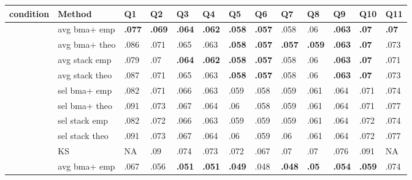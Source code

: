 \documentclass[border={-20pt 28pt 20pt -20pt}]{standalone}
\begin{document}
                   \pagecolor{Mycolor2}
                   \renewcommand{\arraystretch}{1.1} 
\centering\begingroup\fontsize{9}{11}\selectfont

\begin{tabular}{>{\centering\arraybackslash}p{4.4em}>{\centering\arraybackslash}p{7em}>{\centering\arraybackslash}p{1.8em}>{\centering\arraybackslash}p{1.8em}>{\centering\arraybackslash}p{1.8em}>{\centering\arraybackslash}p{1.8em}>{\centering\arraybackslash}p{1.8em}>{\centering\arraybackslash}p{1.8em}>{\centering\arraybackslash}p{1.8em}>{\centering\arraybackslash}p{1.8em}>{\centering\arraybackslash}p{1.8em}>{\centering\arraybackslash}p{1.8em}>{\centering\arraybackslash}p{1.8em}}
\toprule
\textbf{condition} & \textbf{Method} & \textbf{Q1} & \textbf{Q2} & \textbf{Q3} & \textbf{Q4} & \textbf{Q5} & \textbf{Q6} & \textbf{Q7} & \textbf{Q8} & \textbf{Q9} & \textbf{Q10} & \textbf{Q11}\\
\midrule
 & avg bma+ emp & \textbf{.077} & \textbf{.069} & \textbf{.064} & \textbf{.062} & \textbf{.058} & \textbf{.057} & .058 & .06 & \textbf{.063} & \textbf{.07} & \textbf{.07}\\

 & avg bma+ theo & .086 & .071 & .065 & .063 & \textbf{.058} & \textbf{.057} & \textbf{.057} & \textbf{.059} & \textbf{.063} & \textbf{.07} & .073\\

 & avg stack emp & .079 & .07 & \textbf{.064} & \textbf{.062} & \textbf{.058} & \textbf{.057} & .058 & .06 & \textbf{.063} & \textbf{.07} & .071\\

 & avg stack theo & .087 & .071 & .065 & .063 & \textbf{.058} & \textbf{.057} & .058 & .06 & \textbf{.063} & \textbf{.07} & .073\\

 & sel bma+ emp & .082 & .071 & .066 & .063 & .059 & .058 & .059 & .061 & .064 & .071 & .074\\

 & sel bma+ theo & .091 & .073 & .067 & .064 & .06 & .058 & .059 & .061 & .064 & .071 & .077\\

 & sel stack emp & .082 & .072 & .066 & .063 & .059 & .059 & .059 & .061 & .064 & .072 & .074\\

 & sel stack theo & .091 & .073 & .067 & .064 & .06 & .059 & .06 & .061 & .064 & .072 & .077\\

\multirow{-9}{4.4em}{\centering\arraybackslash \textbf{I = 10  N = 100}} & KS & NA & .09 & .074 & .073 & .072 & .067 & .07 & .07 & .076 & .091 & NA\\
\cmidrule{1-13}
 & avg bma+ emp & .067 & .056 & \textbf{.051} & \textbf{.051} & \textbf{.049} & .048 & \textbf{.048} & \textbf{.05} & \textbf{.054} & \textbf{.059} & .074\\


\end{tabular}
\end{document}
